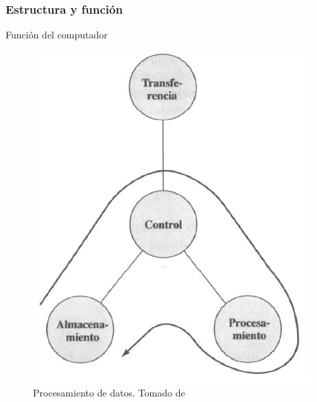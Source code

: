 \documentclass{beamer}
\begin{document}
	\begin{frame}
 		\frametitle{Estructura y función}
		\begin{block}{Función del computador}
\begin{figure}[H]
\centering
\includegraphics[scale=0.4]{imagenes/pc6.png}
\caption{Procesamiento de datos. Tomado de \cite{stallings}}
\end{figure}
		\end{block}
	\end{frame}
	
\end{document}
